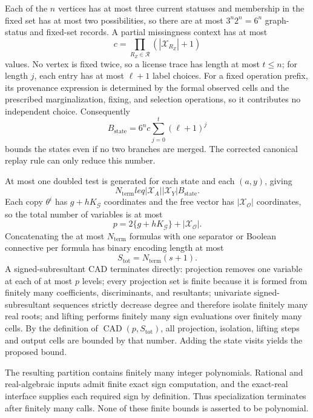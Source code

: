 Each of the \(n\) vertices has at most three current statuses and membership in the fixed set has at most two possibilities, so there are at most \(3^n2^n=6^n\) graph-status and fixed-set records. A partial missingness context has at most
\[
c=\prod_{R_Z\in\mathcal R}(|\mathcal X_{R_Z}|+1)
\]
values. No vertex is fixed twice, so a license trace has length at most \(t\leq n\); for length \(j\), each entry has at most \(\ell+1\) label choices. For a fixed operation prefix, its provenance expression is determined by the formal observed cells and the prescribed marginalization, fixing, and selection operations, so it contributes no independent choice. Consequently
\[
B_{\mathrm{state}}=6^nc\sum_{j=0}^{t}(\ell+1)^j
\]
bounds the states even if no two branches are merged. The corrected canonical replay rule can only reduce this number.

At most one doubled test is generated for each state and each \((a,y)\), giving
\[
N_{\mathrm{term}}leq|\mathcal X_A||\mathcal X_Y|B_{\mathrm{state}}.
\]
Each copy \(\theta^i\) has \(g+hK_{\mathcal G}\) coordinates and the free vector has \(|\mathcal X_{\mathcal O}|\) coordinates, so the total number of variables is at most
\[
p=2\{g+hK_{\mathcal G}\}+|\mathcal X_{\mathcal O}|.
\]
Concatenating the at most \(N_{\mathrm{term}}\) formulas with one separator or Boolean connective per formula has binary encoding length at most
\[
S_{\mathrm{tot}}=N_{\mathrm{term}}(s+1).
\]
A signed-subresultant CAD terminates directly: projection removes one variable at each of at most \(p\) levels; every projection set is finite because it is formed from finitely many coefficients, discriminants, and resultants; univariate signed-subresultant sequences strictly decrease degree and therefore isolate finitely many real roots; and lifting performs finitely many sign evaluations over finitely many cells. By the definition of \(\operatorname{CAD}(p,S_{\mathrm{tot}})\), all projection, isolation, lifting steps and output cells are bounded by that number. Adding the state visits yields the proposed bound.

The resulting partition contains finitely many integer polynomials. Rational and real-algebraic inputs admit finite exact sign computation, and the exact-real interface supplies each required sign by definition. Thus specialization terminates after finitely many calls. None of these finite bounds is asserted to be polynomial.